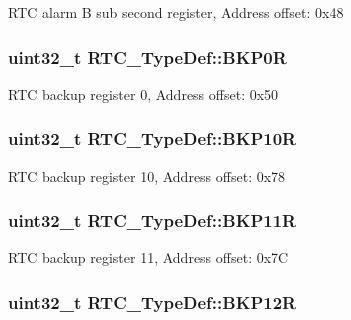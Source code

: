 R\-T\-C alarm B sub second register, Address offset\-: 0x48 \hypertarget{struct_r_t_c___type_def_ab32c76ca1f3bd0f0f46d42c2dfa74524}{
\subsubsection[{B\-K\-P0\-R}]{ uint32\-\_\-t R\-T\-C\-\_\-\-Type\-Def\-::\-B\-K\-P0\-R}}\label{struct_r_t_c___type_def_ab32c76ca1f3bd0f0f46d42c2dfa74524}
R\-T\-C backup register 0, Address offset\-: 0x50 \hypertarget{struct_r_t_c___type_def_a5feba3d5adae3f234b3d172459163c5a}{
\subsubsection[{B\-K\-P10\-R}]{ uint32\-\_\-t R\-T\-C\-\_\-\-Type\-Def\-::\-B\-K\-P10\-R}}\label{struct_r_t_c___type_def_a5feba3d5adae3f234b3d172459163c5a}
R\-T\-C backup register 10, Address offset\-: 0x78 \hypertarget{struct_r_t_c___type_def_a8fef38e1e122778601e18f5b757c037a}{
\subsubsection[{B\-K\-P11\-R}]{ uint32\-\_\-t R\-T\-C\-\_\-\-Type\-Def\-::\-B\-K\-P11\-R}}\label{struct_r_t_c___type_def_a8fef38e1e122778601e18f5b757c037a}
R\-T\-C backup register 11, Address offset\-: 0x7\-C \hypertarget{struct_r_t_c___type_def_a6606b5d249f923aa15ab74b382cbaf7e}{
\subsubsection[{B\-K\-P12\-R}]{ uint32\-\_\-t R\-T\-C\-\_\-\-Type\-Def\-::\-B\-K\-P12\-R}}\label{struct_r_t_c___type_def_a6606b5d249f923aa15ab74b382cbaf7e}
